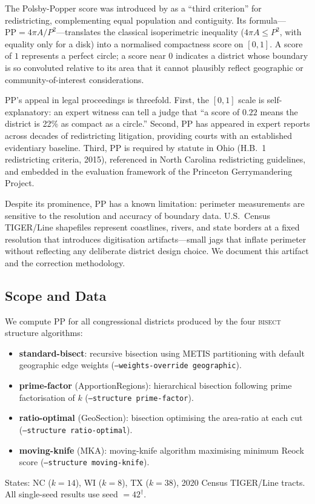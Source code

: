 The Polsby-Popper score was introduced by \citet{polsby1991third} as a
``third criterion'' for redistricting, complementing equal population and
contiguity. Its formula---$\text{PP} = 4\pi A / P^2$---translates the classical
isoperimetric inequality ($4\pi A \leq P^2$, with equality only for a disk) into
a normalised compactness score on $[0,1]$.
A score of $1$ represents a perfect circle; a score near $0$ indicates a district
whose boundary is so convoluted relative to its area that it cannot plausibly
reflect geographic or community-of-interest considerations.

PP's appeal in legal proceedings is threefold.
First, the $[0,1]$ scale is self-explanatory: an expert witness can tell a judge
that ``a score of $0.22$ means the district is 22\% as compact as a circle.''
Second, PP has appeared in expert reports across decades of redistricting
litigation, providing courts with an established evidentiary baseline.
Third, PP is required by statute in Ohio (H.B.\ 1 redistricting criteria,
2015), referenced in North Carolina redistricting guidelines, and embedded in
the evaluation framework of the Princeton Gerrymandering Project.

Despite its prominence, PP has a known limitation: perimeter measurements are
sensitive to the resolution and accuracy of boundary data.
U.S.\ Census TIGER/Line shapefiles represent coastlines, rivers, and state borders
at a fixed resolution that introduces digitisation artifacts---small jags that
inflate perimeter without reflecting any deliberate district design choice.
We document this artifact and the correction methodology.

\subsection{Scope and Data}

We compute PP for all congressional districts produced by the four \textsc{bisect}
structure algorithms:
\begin{itemize}
  \item \textbf{standard-bisect}: recursive bisection using METIS partitioning
    with default geographic edge weights (\texttt{--weights-override geographic}).
  \item \textbf{prime-factor} (ApportionRegions): hierarchical bisection following
    prime factorisation of $k$ (\texttt{--structure prime-factor}).
  \item \textbf{ratio-optimal} (GeoSection): bisection optimising the area-ratio
    at each cut (\texttt{--structure ratio-optimal}).
  \item \textbf{moving-knife} (MKA): moving-knife algorithm maximising minimum
    Reock score (\texttt{--structure moving-knife}).
\end{itemize}
States: NC ($k=14$), WI ($k=8$), TX ($k=38$), 2020 Census TIGER/Line tracts.
All single-seed results use seed $= 42^\dagger$.
